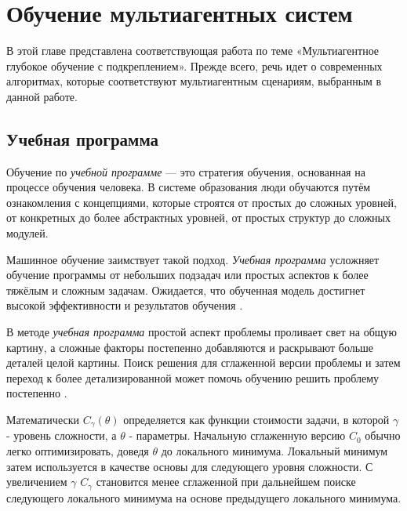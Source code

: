 \chapter{Обучение мультиагентных систем} \label{ch2}



В этой главе представлена соответствующая работа по теме «Мультиагентное глубокое обучение с подкреплением». Прежде всего, речь идет о современных алгоритмах, которые соответствуют мультиагентным сценариям, выбранным в данной работе.





\section{Учебная программа}

Обучение по \textit{учебной программе} — это стратегия обучения, основанная на процессе обучения человека. В системе образования люди обучаются путём ознакомления с концепциями, которые строятся от простых до сложных уровней, от конкретных до более абстрактных уровней, от простых структур до сложных модулей.

Машинное обучение заимствует такой подход. \textit{Учебная программа} усложняет обучение программы от небольших подзадач или простых аспектов к более тяжёлым и сложным задачам. Ожидается, что обученная модель достигнет высокой эффективности и результатов обучения \cite{10.5555/3171837.3172051}.

В методе \textit{учебная программа} простой аспект проблемы проливает свет на общую картину, а сложные факторы постепенно добавляются и раскрывают больше деталей целой картины. Поиск решения для сглаженной версии проблемы и затем переход к более детализированной может помочь обучению решить проблему постепенно \cite{graves2017automated}.

Математически $C_\gamma (\theta)$ определяется как функции стоимости задачи, в которой $\gamma$ - уровень сложности, а $\theta$ - параметры. Начальную сглаженную версию $C_0$ обычно легко оптимизировать, доведя $\theta$ до локального минимума. Локальный минимум затем используется в качестве основы для следующего уровня сложности. С увеличением $\gamma$ $C_\gamma$ становится менее сглаженной при дальнейшем поиске следующего локального минимума на основе предыдущего локального минимума. \cite{10.1145/1553374.1553380}

